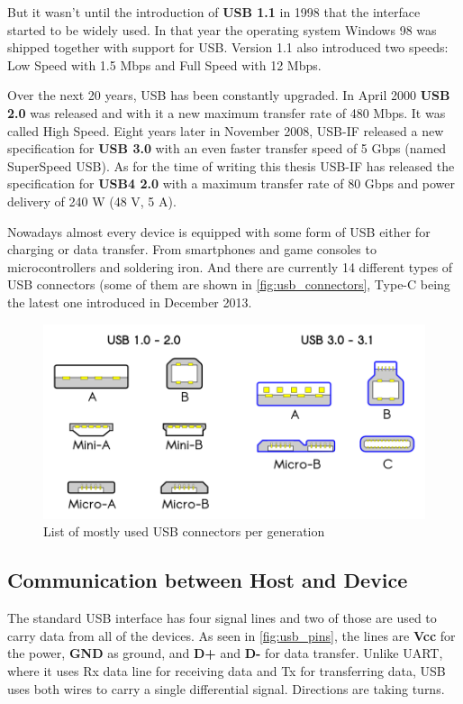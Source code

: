 But it wasn't until the introduction of \textbf{USB 1.1} in 1998 that the interface started to be widely used. In that year the operating system Windows 98 was shipped together with support for USB. Version 1.1 also introduced two speeds: Low Speed with 1.5 Mbps and Full Speed with 12 Mbps.

Over the next 20 years, USB has been constantly upgraded. In April 2000 \textbf{USB 2.0} was released and with it a new maximum transfer rate of 480 Mbps. It was called High Speed. Eight years later in November 2008, USB-IF released a new specification for \textbf{USB 3.0} with an even faster transfer speed of 5 Gbps (named SuperSpeed USB). As for the time of writing this thesis USB-IF has released the specification for \textbf{USB4 2.0} with a maximum transfer rate of 80 Gbps and power delivery of 240 W (48 V, 5 A).

Nowadays almost every device is equipped with some form of USB either for charging or data transfer. From smartphones and game consoles to microcontrollers and soldering iron. And there are currently 14 different types of USB connectors (some of them are shown in \autoref{fig:usb_connectors}, Type-C being the latest one introduced in December 2013.

\begin{figure}[ht]
    \centering
    \includegraphics{./obrazky-figures/USB_connectors.png}
    \caption{List of mostly used USB connectors per generation}
    \label{fig:usb_connectors}
\end{figure}

\subsection*{Communication between Host and Device}
\label{communication}
The standard USB interface has four signal lines and two of those are used to carry data from all of the devices. As seen in \autoref{fig:usb_pins}, the lines are \textbf{Vcc} for the power, \textbf{GND} as ground, and \textbf{D+} and \textbf{D-} for data transfer. Unlike UART, where it uses Rx data line for receiving data and Tx for transferring data, USB uses both wires to carry a single differential signal. Directions are taking turns.

